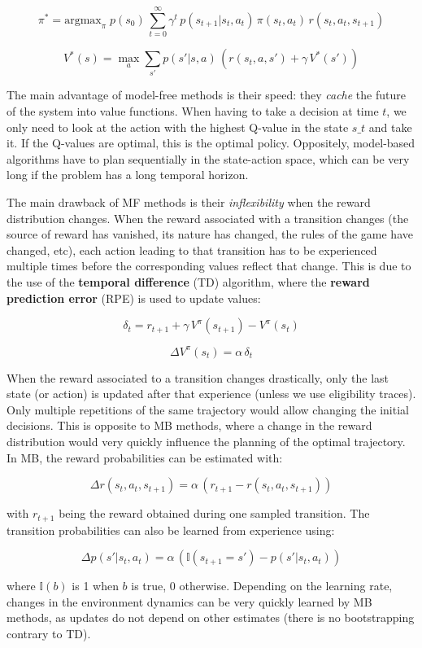 \documentclass[
  11pt,
]{article}
\begin{document}
\[\pi^* = \text{argmax}_{\pi} \; p(s_0) \, \sum_{t=0}^\infty \gamma^t \, p(s_{t+1} | s_t, a_t) \, \pi(s_t, a_t) \, r(s_t, a_t, s_{t+1})\]

\[V^*(s) = \max_a \sum_{s'} p(s' | s, a) \, (r(s_t, a, s')+ \gamma \, V^*(s'))\]

The main advantage of model-free methods is their speed: they
\emph{cache} the future of the system into value functions. When having
to take a decision at time \(t\), we only need to look at the action
with the highest Q-value in the state \(s\_t\) and take it. If the
Q-values are optimal, this is the optimal policy. Oppositely,
model-based algorithms have to plan sequentially in the state-action
space, which can be very long if the problem has a long temporal
horizon.

The main drawback of MF methods is their \emph{inflexibility} when the
reward distribution changes. When the reward associated with a
transition changes (the source of reward has vanished, its nature has
changed, the rules of the game have changed, etc), each action leading
to that transition has to be experienced multiple times before the
corresponding values reflect that change. This is due to the use of the
\textbf{temporal difference} (TD) algorithm, where the \textbf{reward
prediction error} (RPE) is used to update values:

\[\delta_t = r_{t+1} + \gamma \, V^\pi(s_{t+1}) - V^\pi(s_t)\]

\[\Delta V^\pi(s_t) = \alpha \, \delta_t\]

When the reward associated to a transition changes drastically, only the
last state (or action) is updated after that experience (unless we use
eligibility traces). Only multiple repetitions of the same trajectory
would allow changing the initial decisions. This is opposite to MB
methods, where a change in the reward distribution would very quickly
influence the planning of the optimal trajectory. In MB, the reward
probabilities can be estimated with:

\[
    \Delta r(s_t, a_t, s_{t+1}) = \alpha \, (r_{t+1} - r(s_t, a_t, s_{t+1}))
\]

with \(r_{t+1}\) being the reward obtained during one sampled
transition. The transition probabilities can also be learned from
experience using:

\[
    \Delta p(s' | s_t, a_t) = \alpha \, (\mathbb{I}(s_{t+1} = s') - p(s' | s_t, a_t))
\]

where \(\mathbb{I}(b)\) is 1 when \(b\) is true, 0 otherwise. Depending
on the learning rate, changes in the environment dynamics can be very
quickly learned by MB methods, as updates do not depend on other
estimates (there is no bootstrapping contrary to TD).
\end{document}
